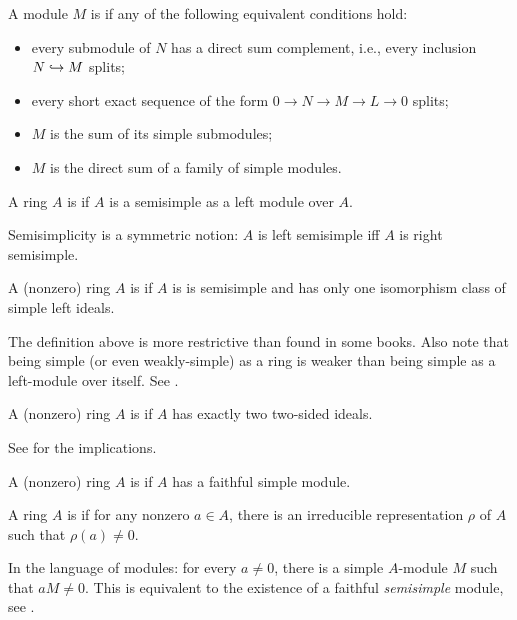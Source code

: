 \documentclass[12pt]{article}
\begin{document}
\begin{defn} \label{defn:semisimple}
	A module $M$ is  if any of the following equivalent conditions hold: 
	\begin{itemize}
		\item every submodule of $N$ has a direct sum complement, i.e., every inclusion $N \hookrightarrow M$ splits;
		\item every short exact sequence of the form $0 \to N \to M \to L \to 0$ splits;
		\item $M$ is the sum of its simple submodules;
		\item $M$ is the direct sum of a family of simple modules.
	\end{itemize} 

	A ring $A$ is  if $A$ is a semisimple as a left module over $A$.
\end{defn}
Semisimplicity is a symmetric notion: $A$ is left semisimple iff $A$ is right semisimple.

\begin{defn} \label{defn:simple}
	A (nonzero) ring $A$ is  if $A$ is is semisimple and has only one isomorphism class of simple left ideals.
\end{defn}

The definition above is more restrictive than found in some books. 
Also note that being simple (or even weakly-simple) as a ring is weaker than being simple as a left-module over itself. 
See .

\begin{defn} \label{defn:weakly-simple}
	A (nonzero) ring $A$ is  if $A$ has exactly two two-sided ideals.
\end{defn}
See  for the implications. 

\begin{defn}
	A (nonzero) ring $A$ is  if $A$ has a faithful simple module. 
\end{defn}

\begin{defn}
	A ring $A$ is  if for any nonzero $a \in A$, there is an irreducible representation $\rho$ of $A$ such that $\rho(a) \neq 0$.
\end{defn}
In the language of modules: for every $a \neq 0$, there is a simple $A$-module $M$ such that $aM \neq 0$. \newline
This is equivalent to the existence of a faithful \emph{semisimple} module, see .
\end{document}

